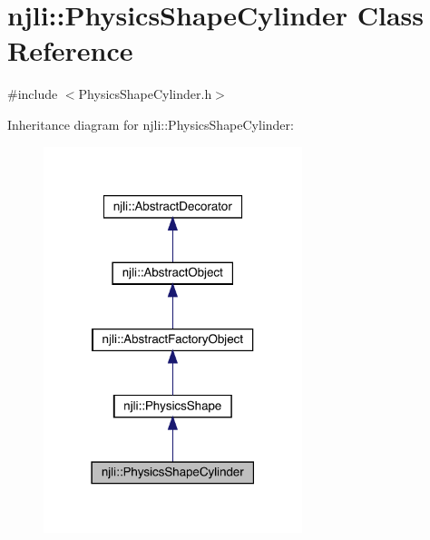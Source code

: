 \hypertarget{classnjli_1_1_physics_shape_cylinder}{}\section{njli\+:\+:Physics\+Shape\+Cylinder Class Reference}
\label{classnjli_1_1_physics_shape_cylinder}


{\ttfamily \#include $<$Physics\+Shape\+Cylinder.\+h$>$}



Inheritance diagram for njli\+:\+:Physics\+Shape\+Cylinder\+:\nopagebreak
\begin{figure}[H]
\begin{center}
\leavevmode
\includegraphics[width=214pt]{classnjli_1_1_physics_shape_cylinder__inherit__graph}
\end{center}
\end{figure}


